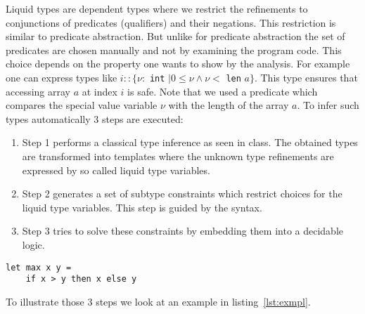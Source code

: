 \documentclass[a4paper,UKenglish]{lipics-v2016}
\begin{document}
Liquid types are dependent types where we restrict the refinements to conjunctions of predicates (qualifiers) and their negations.
This restriction is similar to predicate abstraction.
But unlike for predicate abstraction the set of predicates are chosen manually and not by examining the program code.
This choice depends on the property one wants to show by the analysis.
For example one can express types like $i:: \{\nu:$ \lstinline{int} $\mid 0 \le \nu \land \nu <$ \lstinline{len} $a\}$.
This type ensures that accessing array $a$ at index $i$ is safe.
Note that we used a predicate which compares the special value variable $\nu$ with the length of the array $a$.
To infer such types automatically 3 steps are executed:
\begin{enumerate}
    \item Step 1 performs a classical type inference as seen in class.
        The obtained types are transformed into templates where the unknown type refinements are expressed by so called liquid type variables.
    \item Step 2 generates a set of subtype constraints which restrict choices for the liquid type variables.
        This step is guided by the syntax.
    \item Step 3 tries to solve these constraints by embedding them into a decidable logic.
\end{enumerate}


\begin{lstlisting}[caption={Example Program},label=lst:exmpl,captionpos=t,float,abovecaptionskip=-\medskipamount]
let max x y =
    if x > y then x else y
\end{lstlisting}

To illustrate those 3 steps we look at an example in listing~\ref{lst:exmpl}.
\end{document}
